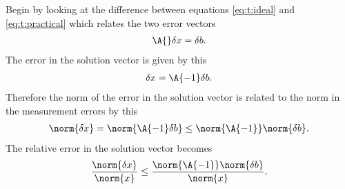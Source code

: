 Begin by looking at the difference between equations \eqref{eq:t:ideal} and \eqref{eq:t:practical} which relates the two error vectors
\begin{equation}
  \begin{split}
    \A{} \delta x = \delta b.
  \end{split}
\end{equation}
The error in the solution vector is given by this
\begin{equation}
  \begin{split}
    \delta x = \A{-1}\delta b.
  \end{split}
\end{equation}
Therefore the norm of the error in the solution vector is related to the norm in the measurement errors by this
\begin{equation}
  \begin{split}
    \norm{\delta x} = \norm{\A{-1}\delta b}\le \norm{\A{-1}} \norm{\delta b}.
  \end{split}
\end{equation}
The relative error in the solution vector becomes
\begin{equation}
  \begin{split}
    \frac{ \norm{\delta x}}{\norm{x}} \le \frac{ \norm{\A{-1}} \norm{\delta b}}{\norm{x}}.
  \end{split}
  \label{eq:t:errx}
\end{equation}

